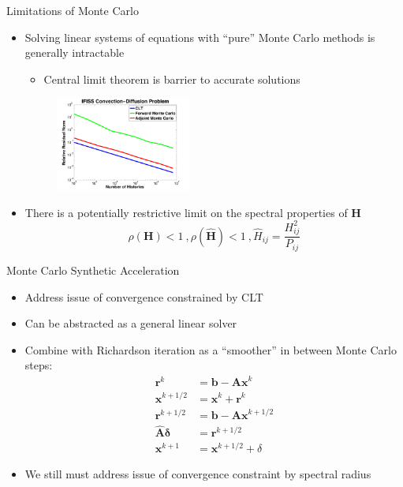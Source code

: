 \documentclass{beamer}
\begin{document}
\begin{frame}{Limitations of Monte Carlo}
  \begin{itemize}
  \item Solving linear systems of equations with ``pure'' Monte Carlo methods
    is generally intractable
    \begin{itemize}
    \item Central limit theorem is barrier to accurate solutions
    \end{itemize}
    \begin{figure}
      \centering
      \includegraphics[width=1.75in]{../NCState_seminar_2014/Ifiss_ConvDiff}
    \end{figure}
  \item There is a potentially restrictive limit on the spectral properties of
    $\mathbf{H}$
    \begin{equation*}
      \rho(\mathbf{H}) < 1\:, \rho(\hat{\mathbf{H}}) < 1\:, \hat{H}_{ij} =
      \frac{H_{ij}^2}{P_{ij}}
    \end{equation*}
  \end{itemize}
\end{frame}


\begin{frame}{Monte Carlo Synthetic Acceleration}
  \begin{itemize}
  \item Address issue of convergence constrained by CLT
    \vfill
  \item Can be abstracted as a general linear solver
    \vfill
  \item Combine with Richardson iteration as a ``smoother'' in between
    Monte Carlo steps:
    \begin{align*}
      \mathbf{r}^k &= \mathbf{b} - \mathbf{Ax}^k \\
      \mathbf{x}^{k+1/2} &= \mathbf{x}^k + \mathbf{r}^k \\
      \mathbf{r}^{k+1/2} &= \mathbf{b} - \mathbf{Ax}^{k+1/2} \\
      \hat{\mathbf{A}} \mathbf{\delta} &= \mathbf{r}^{k+1/2} \\
      \mathbf{x}^{k+1} &= \mathbf{x}^{k+1/2} + \delta
    \end{align*}
  \item We still must address issue of convergence constraint by spectral radius
  \end{itemize}
\end{frame}
\end{document}
